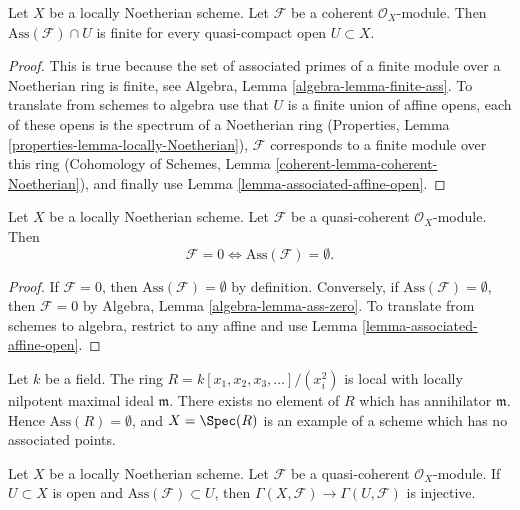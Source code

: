 \begin{lemma}
\label{lemma-finite-ass}
Let $X$ be a locally Noetherian scheme.
Let $\mathcal{F}$ be a coherent $\mathcal{O}_X$-module.
Then $\text{Ass}(\mathcal{F}) \cap U$ is finite for
every quasi-compact open $U \subset X$.
\end{lemma}

\begin{proof}
This is true because the set of associated primes of a finite module over
a Noetherian ring is finite, see
Algebra, Lemma \ref{algebra-lemma-finite-ass}.
To translate from schemes to algebra use that $U$ is a finite union of
affine opens, each of these opens is the spectrum of a Noetherian ring
(Properties, Lemma \ref{properties-lemma-locally-Noetherian}),
$\mathcal{F}$ corresponds to a finite module over this ring
(Cohomology of Schemes, Lemma \ref{coherent-lemma-coherent-Noetherian}),
and finally use
Lemma \ref{lemma-associated-affine-open}.
\end{proof}

\begin{lemma}
\label{lemma-ass-zero}
Let $X$ be a locally Noetherian scheme. Let $\mathcal{F}$ be a
quasi-coherent $\mathcal{O}_X$-module. Then
$$
\mathcal{F} = 0 \Leftrightarrow \text{Ass}(\mathcal{F}) = \emptyset.
$$
\end{lemma}

\begin{proof}
If $\mathcal{F} = 0$, then $\text{Ass}(\mathcal{F}) = \emptyset$
by definition. Conversely, if $\text{Ass}(\mathcal{F}) = \emptyset$,
then $\mathcal{F} = 0$ by
Algebra, Lemma \ref{algebra-lemma-ass-zero}.
To translate from schemes to algebra, restrict to any affine and use
Lemma \ref{lemma-associated-affine-open}.
\end{proof}

\begin{example}
\label{example-no-associated-prime}
Let $k$ be a field. The ring $R = k[x_1, x_2, x_3, \ldots]/(x_i^2)$
is local with locally nilpotent maximal ideal $\mathfrak m$.
There exists no element of $R$ which has annihilator $\mathfrak m$.
Hence $\text{Ass}(R) = \emptyset$, and $X = \Spec(R)$
is an example of a scheme which has no associated points.
\end{example}

\begin{lemma}
\label{lemma-restriction-injective-open-contains-ass}
Let $X$ be a locally Noetherian scheme. Let $\mathcal{F}$ be a quasi-coherent
$\mathcal{O}_X$-module. If $U \subset X$ is open and
$\text{Ass}(\mathcal{F}) \subset U$, then
$\Gamma(X, \mathcal{F}) \to \Gamma(U, \mathcal{F})$ is injective.
\end{lemma}

